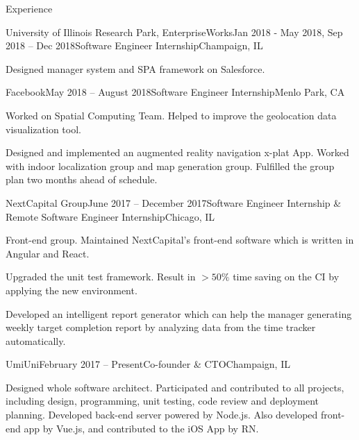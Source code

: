 \documentclass{resume} %
\begin{document}
\begin{rSection}{Experience}

\begin{rSubsection}{University of Illinois Research Park, EnterpriseWorks}{Jan 2018 - May 2018, Sep 2018 -- Dec 2018}{Software Engineer Internship}{Champaign, IL}
\item Designed manager system and SPA framework on Salesforce.
\end{rSubsection}

\begin{rSubsection}{Facebook}{May 2018 -- August 2018}{Software Engineer Internship}{Menlo Park, CA}
\item Worked on Spatial Computing Team. Helped to improve the geolocation data visualization tool.
\item Designed and implemented an augmented reality navigation x-plat App. Worked with indoor localization group and map generation group. Fulfilled the group plan two months ahead of schedule.
\end{rSubsection}

\begin{rSubsection}{NextCapital Group}{June 2017 -- December 2017}{Software Engineer Internship \& Remote Software Engineer Internship}{Chicago, IL}

\item Front-end group. Maintained NextCapital's front-end software which is written in Angular and React.
\item Upgraded the unit test framework. Result in $>50\%$ time saving on the CI by applying the new environment.
\item Developed an intelligent report generator which can help the manager generating weekly target completion report by analyzing data from the time tracker automatically.

\end{rSubsection}

\begin{rSubsection}{UmiUni}{February 2017 -- Present}{Co-founder \& CTO}{Champaign, IL}

\item Designed whole software architect. Participated and contributed to all projects, including design, programming, unit testing, code review and deployment planning. Developed back-end server powered by Node.js. Also developed front-end app by Vue.js, and contributed to the iOS App by RN.

\end{rSubsection}


\end{rSection}
\end{document}
